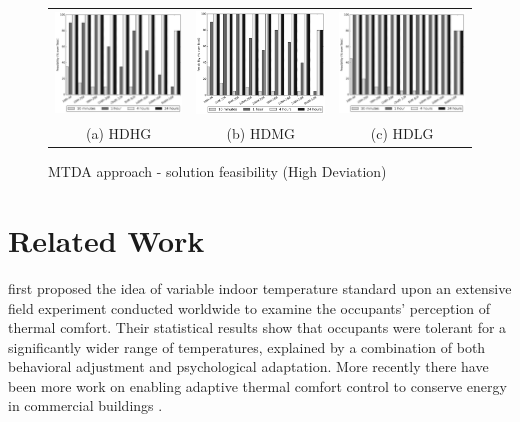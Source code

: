 \begin{figure}
\begin{tabular}{ccc}
\includegraphics[width=.30\linewidth,keepaspectratio]{figs/feasibility_cvs_oarb_high_highr_mtd.png} &
\includegraphics[width=.30\linewidth,keepaspectratio]{figs/feasibility_cvs_oarb_high_mediumr_mtd.png} &
\includegraphics[width=.30\linewidth,keepaspectratio]{figs/feasibility_cvs_oarb_high_lowr_mtd.png} \\
(a) HDHG & (b) HDMG & (c) HDLG
\end{tabular}
\caption{MTDA approach - solution feasibility (High Deviation)}
\label{fig:mtd_mfhr}
\end{figure}







\section{Related Work}\label{sec:atc_related}

\cite{de1998developing} first proposed the idea of variable indoor temperature standard upon an extensive field experiment conducted worldwide to examine the occupants' perception of thermal comfort. Their statistical results show that occupants were tolerant for a significantly wider range of temperatures, explained by a combination of both behavioral adjustment and psychological adaptation. More recently there have been more work on enabling adaptive thermal comfort control to conserve energy in commercial buildings \citep{egan2010the,chew2015adaptive,klein2012coordinating,ward2010automate,yang2013development}.

